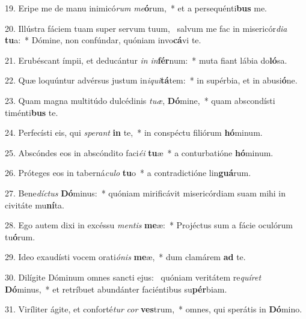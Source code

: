 19. Eripe me de manu inimicó\textit{rum} \textit{me}\textbf{ó}rum,~*  et a persequénti\textbf{bus} me.\

20. Illústra fáciem tuam super servum tuum, \dag\  salvum me fac in misericór\textit{di}\textit{a} \textbf{tu}a:~*  Dómine, non confúndar, quóniam invo\textbf{cá}vi te.\

21. Erubéscant ímpii, et deducántur \textit{in} \textit{in}\textbf{fér}num:~*  muta fiant lábia do\textbf{ló}sa.\

22. Quæ loquúntur advérsus justum in\textit{i}\textit{qui}\textbf{tá}tem:~*  in supérbia, et in abusi\textbf{ó}ne.\

23. Quam magna multitúdo dulcédinis \textit{tu}\textit{æ}, \textbf{Dó}mine,~*  quam abscondísti timénti\textbf{bus} te.\

24. Perfecísti eis, qui \textit{spe}\textit{rant} \textbf{in} te,~*  in conspéctu filiórum \textbf{hó}minum.\

25. Abscóndes eos in abscóndito faci\textit{é}\textit{i} \textbf{tu}æ~*  a conturbatióne \textbf{hó}minum.\

26. Próteges eos in taberná\textit{cu}\textit{lo} \textbf{tu}o~*  a contradictióne lin\textbf{guá}rum.\

27. Bene\textit{díc}\textit{tus} \textbf{Dó}minus:~*  quóniam mirificávit misericórdiam suam mihi in civitáte mu\textbf{ní}ta.\

28. Ego autem dixi in excéssu \textit{men}\textit{tis} \textbf{me}æ:~*  Projéctus sum a fácie oculórum tu\textbf{ó}rum.\

29. Ideo exaudísti vocem orati\textit{ó}\textit{nis} \textbf{me}æ,~*  dum clamárem \textbf{ad} te.\

30. Dilígite Dóminum omnes sancti ejus: \dag\  quóniam veritátem re\textit{quí}\textit{ret} \textbf{Dó}minus,~*  et retríbuet abundánter faciéntibus su\textbf{pér}biam.\

31. Viríliter ágite, et conforté\textit{tur} \textit{cor} \textbf{ves}trum,~*  omnes, qui sperátis in \textbf{Dó}mino.\

